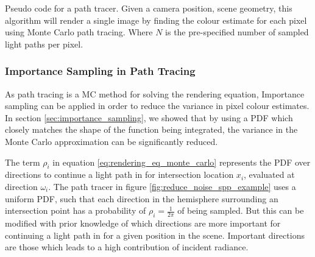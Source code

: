 \documentclass[../dissertation.tex]{subfiles}
\begin{document}
\begin{algorithm}[H]
\label{alg:forward_path_tracing}
\SetAlgoLined
 \caption{Pseudo code for a path tracer. Given a camera position, scene geometry, this algorithm will render a single image by finding the colour estimate for each pixel using Monte Carlo path tracing. Where $N$ is the pre-specified number of sampled light paths per pixel.}
\end{algorithm}


\subsubsection{Importance Sampling in Path Tracing}

As path tracing is a MC method for solving the rendering equation, Importance sampling can be applied in order to reduce the variance in pixel colour estimates. In section \ref{sec:importance_sampling}, we showed that by using a PDF which closely matches the shape of the function being integrated, the variance in the Monte Carlo approximation can be significantly reduced. 

The term $\rho_i$ in equation \ref{eq:rendering_eq_monte_carlo} represents the PDF over directions to continue a light path in for intersection location $x_i$, evaluated at direction $\omega_i$. The path tracer in figure \ref{fig:reduce_noise_spp_example} uses a uniform PDF, such that each direction in the hemisphere surrounding an intersection point has a probability of $\rho_i = \frac{1}{2\pi}$ of being sampled. But this can be modified with prior knowledge of which directions are more important for continuing a light path in for a given position in the scene. Important directions are those which leads to a high contribution of incident radiance.
\end{document}
